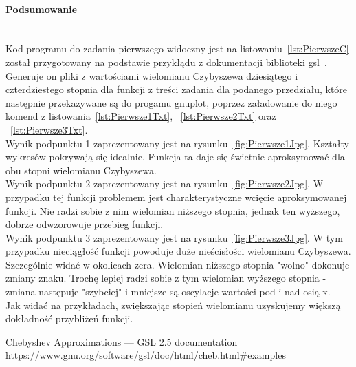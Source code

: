\paragraph{Podsumowanie}~\\
Kod programu do zadania pierwszego widoczny jest na listowaniu~\ref{lst:PierwszeC} został przygotowany na podstawie przykłądu z dokumentacji biblioteki gsl~\cite{ChebyshevApproximationsGSL25Documentation}.
Generuje on pliki z wartościami wielomianu Czybyszewa dziesiątego i czterdziestego stopnia dla funkcji z treści zadania dla podanego przedziału, które następnie przekazywane są do progamu gnuplot, poprzez załadowanie do niego komend z listowania~\ref{lst:Pierwsze1Txt}, ~\ref{lst:Pierwsze2Txt} oraz ~\ref{lst:Pierwsze3Txt}.
\\
Wynik podpunktu 1 zaprezentowany jest na rysunku~\ref{fig:Pierwsze1Jpg}.
Kształty wykresów pokrywają się idealnie.
Funkcja ta daje się świetnie aproksymować dla obu stopni wielomianu Czybyszewa.
\\
Wynik podpunktu 2 zaprezentowany jest na rysunku~\ref{fig:Pierwsze2Jpg}.
W przypadku tej funkcji problemem jest charakterystyczne wcięcie aproksymowanej funkcji.
Nie radzi sobie z nim wielomian niższego stopnia, jednak ten wyższego, dobrze odwzorowuje przebieg funkcji.
\\
Wynik podpunktu 3 zaprezentowany jest na rysunku~\ref{fig:Pierwsze3Jpg}.
W tym przypadku nieciągłość funkcji powoduje duże nieścisłości wielomianu Czybyszewa.
Szczególnie widać w okolicach zera.
Wielomian niższego stopnia "wolno" dokonuje zmiany znaku.
Trochę lepiej radzi sobie z tym wielomian wyższego stopnia - zmiana następuje "szybciej" i mniejsze są oscylacje wartości pod i nad osią x.
\\
Jak widać na przykładach, zwiększając stopień wielomianu uzyskujemy większą dokładność przybliżeń funkcji.

\begin{thebibliography}{9}
   Chebyshev Approximations — GSL 2.5 documentation https://www.gnu.org/software/gsl/doc/html/cheb.html\#examples
\end{thebibliography}
